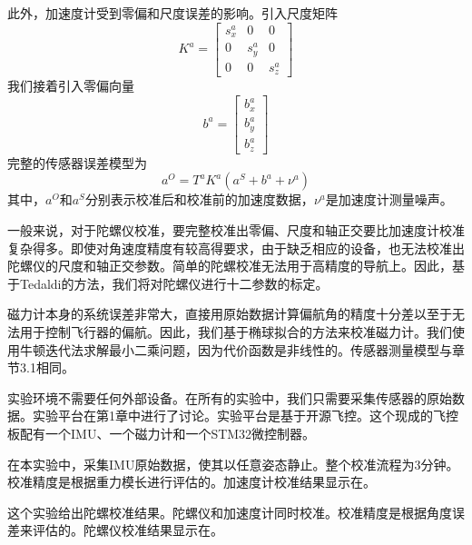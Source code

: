 \documentclass[
  type=master
]{gdutthesis}
\begin{document}
此外，加速度计受到零偏和尺度误差的影响。引入尺度矩阵
\begin{equation}\label{eq:scaleerror}
	K^{a}=
	\begin{bmatrix}
		s^a_x & 0 & 0\\
		0 & s^a_y & 0\\
		0 & 0 & s^a_z
	\end{bmatrix}
\end{equation}
我们接着引入零偏向量
\begin{equation}\label{eq:scaleerror}
	b^{a}=
	\begin{bmatrix}
		b^a_x\\
		b^a_y\\
		b^a_z
	\end{bmatrix}
\end{equation}
完整的传感器误差模型为
\begin{equation}\label{eq:sensorerrormodel}
	a^O=T^a K^a (a^S + b^a + \nu^a)
\end{equation}
其中，$a^O$和$a^S$分别表示校准后和校准前的加速度数据，$ν^a$是加速度计测量噪声。

一般来说，对于陀螺仪校准，要完整校准出零偏、尺度和轴正交要比加速度计校准复杂得多。即使对角速度精度有较高得要求，由于缺乏相应的设备，也无法校准出陀螺仪的尺度和轴正交参数。简单的陀螺校准无法用于高精度的导航上。因此，基于Tedaldi的方法\cite{tedaldi2014robust}，我们将对陀螺仪进行十二参数的标定。

磁力计本身的系统误差非常大，直接用原始数据计算偏航角的精度十分差以至于无法用于控制飞行器的偏航。因此，我们基于椭球拟合的方法来校准磁力计\cite{李勇2012基于椭球拟合的三轴磁传感器误差补偿方法}。我们使用牛顿迭代法求解最小二乘问题，因为代价函数是非线性的。传感器测量模型与章节3.1相同。

实验环境不需要任何外部设备。在所有的实验中，我们只需要采集传感器的原始数据。实验平台在第1章中进行了讨论。实验平台是基于开源飞控。这个现成的飞控板配有一个IMU、一个磁力计和一个STM32微控制器。

在本实验中，采集IMU原始数据，使其以任意姿态静止。整个校准流程为3分钟。校准精度是根据重力模长进行评估的。加速度计校准结果显示在。

这个实验给出陀螺校准结果。陀螺仪和加速度计同时校准。校准精度是根据角度误差来评估的。陀螺仪校准结果显示在。
\end{document}
